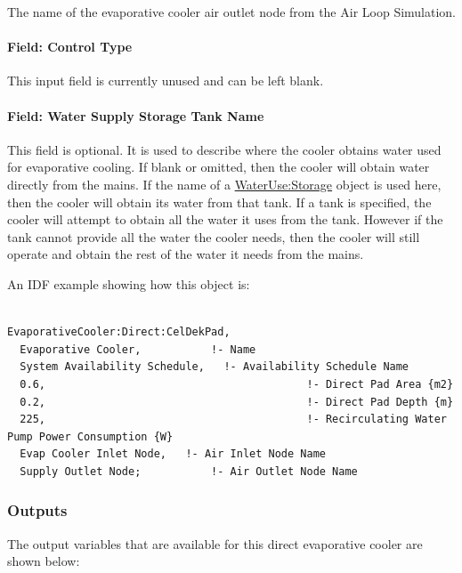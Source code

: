 The name of the evaporative cooler air outlet node from the Air Loop Simulation.

\paragraph{Field: Control Type}\label{field-control-type-001}

This input field is currently unused and can be left blank.

\paragraph{Field: Water Supply Storage Tank Name}\label{field-water-supply-storage-tank-name-000}

This field is optional. It is used to describe where the cooler obtains water used for evaporative cooling. If blank or omitted, then the cooler will obtain water directly from the mains. If the name of a \hyperref[waterusestorage]{WaterUse:Storage} object is used here, then the cooler will obtain its water from that tank. If a tank is specified, the cooler will attempt to obtain all the water it uses from the tank. However if the tank cannot provide all the water the cooler needs, then the cooler will still operate and obtain the rest of the water it needs from the mains.

An IDF example showing how this object is:

\begin{lstlisting}

EvaporativeCooler:Direct:CelDekPad,
  Evaporative Cooler,           !- Name
  System Availability Schedule,   !- Availability Schedule Name
  0.6,                                         !- Direct Pad Area {m2}
  0.2,                                         !- Direct Pad Depth {m}
  225,                                         !- Recirculating Water Pump Power Consumption {W}
  Evap Cooler Inlet Node,   !- Air Inlet Node Name
  Supply Outlet Node;           !- Air Outlet Node Name
\end{lstlisting}

\subsubsection{Outputs}\label{outputs-011}

The output variables that are available for this direct evaporative cooler are shown below:

